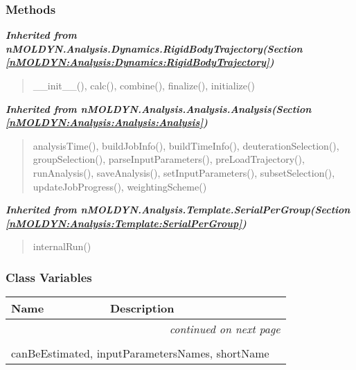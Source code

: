 
  \subsubsection{Methods}


\large{\textbf{\textit{Inherited from nMOLDYN.Analysis.Dynamics.RigidBodyTrajectory\textit{(Section \ref{nMOLDYN:Analysis:Dynamics:RigidBodyTrajectory})}}}}

\begin{quote}
\_\_init\_\_(), calc(), combine(), finalize(), initialize()
\end{quote}

\large{\textbf{\textit{Inherited from nMOLDYN.Analysis.Analysis.Analysis\textit{(Section \ref{nMOLDYN:Analysis:Analysis:Analysis})}}}}

\begin{quote}
analysisTime(), buildJobInfo(), buildTimeInfo(), deuterationSelection(), groupSelection(), parseInputParameters(), preLoadTrajectory(), runAnalysis(), saveAnalysis(), setInputParameters(), subsetSelection(), updateJobProgress(), weightingScheme()
\end{quote}

\large{\textbf{\textit{Inherited from nMOLDYN.Analysis.Template.SerialPerGroup\textit{(Section \ref{nMOLDYN:Analysis:Template:SerialPerGroup})}}}}

\begin{quote}
internalRun()
\end{quote}


  \subsubsection{Class Variables}

    \vspace{-1cm}
\hspace{\varindent}\begin{longtable}{|p{\varnamewidth}|p{\vardescrwidth}|l}
\cline{1-2}
\cline{1-2} \centering \textbf{Name} & \centering \textbf{Description}& \\
\cline{1-2}
\endhead\cline{1-2}\multicolumn{3}{r}{\small\textit{continued on next page}}\\\endfoot\cline{1-2}
\endlastfoot\multicolumn{2}{|l|}{\textit{Inherited from nMOLDYN.Analysis.Dynamics.RigidBodyTrajectory \textit{(Section \ref{nMOLDYN:Analysis:Dynamics:RigidBodyTrajectory})}}}\\
\multicolumn{2}{|p{\varwidth}|}{\raggedright canBeEstimated, inputParametersNames, shortName}\\
\cline{1-2}
\end{longtable}

